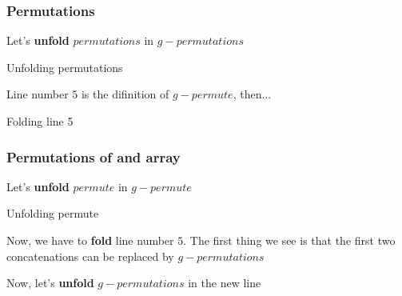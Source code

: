 \documentclass{beamer}
\begin{document}
\begin{frame}
	\frametitle{Permutations}
	Let's \textbf{unfold} $permutations$ in $g-permutations$
	\begin{block}{Unfolding permutations}
		\tiny
		\begin{algorithmic}[1]
					\State {}
				\Else
					\State {}
				\EndIf
			\EndProcedure
		\end{algorithmic}
	\end{block}
	Line number $5$ is the difinition of $g-permute$, then...
	\begin{block}{Folding line 5}
		\tiny
		\begin{algorithmic}[1]
					\State {}
				\Else
					\State {}
				\EndIf
			\EndProcedure
		\end{algorithmic}
	\end{block}
\end{frame}
\begin{frame}
	\frametitle{Permutations of and array}
	Let's \textbf{unfold} $permute$ in $g-permute$
	\begin{block}{Unfolding permute}
		\tiny
		\begin{algorithmic}[1]
					\State {}					
				\Else
					\State {}
				\EndIf
			\EndProcedure
		\end{algorithmic}
	\end{block}
	Now, we have to \textbf{fold} line number $5$. The first thing we see is that the first two concatenations can be replaced by $g-permutations$
	\begin{algorithmic}[1]
		\tiny
		\State {}
	\end{algorithmic}
	Now, let's \textbf{unfold} $g-permutations$ in the new line
	\begin{algorithmic}[1]
		\tiny
			\State {}
		\Else
			\State {}
		\EndIf
	\end{algorithmic}
\end{frame}
\end{document}

